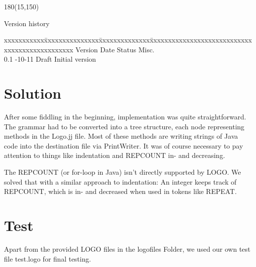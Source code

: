 \documentclass[
	a4paper,					%
	10pt,							%
	twoside,					%
	notitlepage,			%
	parskip=half,			%
]{scrreprt}					%
\begin{document}
%
%

\begin{textblock}{180}(15,150)
\color{black}
\begin{huge}
Version history
\end{huge}
\vspace{10mm}

\fontsize{10pt}{18pt}\selectfont
\begin{tabbing}
xxxxxxxxxxx\=xxxxxxxxxxxxxxx\=xxxxxxxxxxxxxx\=xxxxxxxxxxxxxxxxxxxxxxxxxxxxxxxxxxxxxxxxxxxxxxx \kill
Version	\> Date	\> Status		\> Misc.		\\
0.1	-10-11	\> Draft		\> Initial version	\\
\end{tabbing}

\end{textblock}

\cleardoubleemptypage
\setcounter{page}{1}
\cleardoublepage
{}
\let\cleardoublepage\clearpage








\chapter{Solution}
\label{chap:solution}
After some fiddling in the beginning, implementation was quite straightforward. The grammar had to be converted into a tree structure, each node representing methods in the Logo.jj file. Most of these methods are writing strings of Java code into the destination file via PrintWriter. It was of course necessary to pay attention to things like indentation and REPCOUNT in- and decreasing.

The REPCOUNT (or for-loop in Java) isn't directly supported by LOGO. We solved that with a similar approach to indentation: An integer keeps track of REPCOUNT, which is in- and decreased when used in tokens like REPEAT.

\begingroup
\renewcommand{\cleardoublepage}{}
\renewcommand{\clearpage}{}
\chapter{Test}
\label{chap:test}
Apart from the provided LOGO files in the logofiles Folder, we used our own test file test.logo for final testing.
\endgroup
\end{document}

